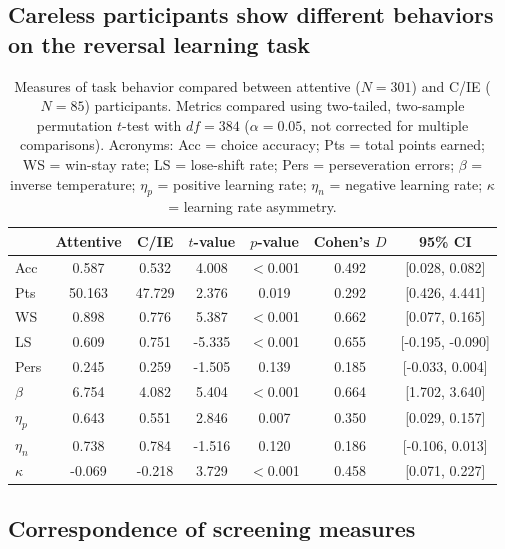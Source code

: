 \documentclass[a4paper,notitlepage,12pt]{article}
\begin{document}
\subsection*{Careless participants show different behaviors on the reversal learning task}
\begin{table}[H]
    \centering
    \begin{tabular}{lcccccc}
    \toprule
    {} &  Attentive &    C/IE &   $t$-value &   $p$-value &  Cohen's $D$ & 95\% CI \\
    \midrule
    Acc      &      0.587 &   0.532 &  4.008 &  $<$0.001 &  0.492 &    [0.028, 0.082] \\
    Pts      &     50.163 &  47.729 &  2.376 &     0.019 &  0.292 &    [0.426, 4.441] \\
    WS       &      0.898 &   0.776 &  5.387 &  $<$0.001 &  0.662 &    [0.077, 0.165] \\
    LS       &      0.609 &   0.751 & -5.335 &  $<$0.001 &  0.655 &  [-0.195, -0.090] \\
    Pers     &      0.245 &   0.259 & -1.505 &     0.139 &  0.185 &   [-0.033, 0.004] \\
    $\beta$  &      6.754 &   4.082 &  5.404 &  $<$0.001 &  0.664 &    [1.702, 3.640] \\
    $\eta_p$ &      0.643 &   0.551 &  2.846 &     0.007 &  0.350 &    [0.029, 0.157] \\
    $\eta_n$ &      0.738 &   0.784 & -1.516 &     0.120 &  0.186 &   [-0.106, 0.013] \\
    $\kappa$ &     -0.069 &  -0.218 &  3.729 &  $<$0.001 &  0.458 &    [0.071, 0.227] \\
    \bottomrule
    \end{tabular}
    \captionsetup{width=0.88\textwidth}
    \caption{Measures of task behavior compared between attentive ($N=301$) and C/IE ($N=85$) participants. Metrics compared using two-tailed, two-sample permutation $t$-test with $df=384$ ($\alpha = 0.05$, not corrected for multiple comparisons). Acronyms: Acc = choice accuracy; Pts = total points earned; WS = win-stay rate; LS = lose-shift rate; Pers = perseveration errors; $\beta$ = inverse temperature; $\eta_p$ = positive learning rate; $\eta_n$ = negative learning rate; $\kappa$ = learning rate asymmetry.}
    \label{tab:tabS02}
\end{table}

\clearpage
\subsection*{Correspondence of screening measures}
\end{document}
